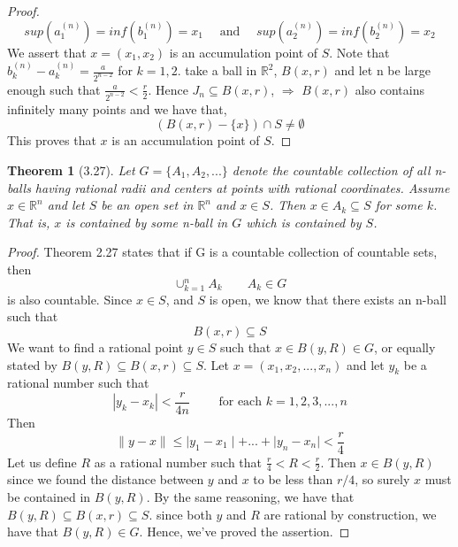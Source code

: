 \documentclass[aps,pra,notitlepage,amsmath,amssymb,letterpaper,12pt]{revtex4-1}
\newtheorem{theorem}{Theorem}
\begin{document}
\begin{proof}
$$sup(a_{1}^{(n)}) = inf(b_{1}^{(n)}) = x_{1} \quad \textrm{ and } \quad sup(a_{2}^{(n)}) = inf(b_{2}^{(n)}) = x_{2}$$
We assert that $x=(x_{1}, x_{2})$ is an accumulation point of $S$. Note that $b_{k}^{(n)}-a_{k}^{(n)} = \frac{a}{2^{n-2}}$ for $k = 1,2$. take a ball in $\mathbb{R}^{2}$, $B(x,r)$ and let n be large enough such that $\frac{a}{2^{n-2}} < \frac{r}{2}$. Hence $J_{n} \subseteq B(x,r)$, $\Rightarrow$ $B(x,r)$ also contains infinitely many points and we have that,
$$ (B(x,r)- \{x\}) \cap S \ne \emptyset $$
This proves that $x$ is an accumulation point of $S$.



\end{proof}


\begin{theorem}[3.27] \nonumber
Let $G = \{A_{1},A_{2},...\}$ denote the countable collection of all n-balls having rational radii and centers at points with rational coordinates. Assume $x \in \mathbb{R}^n$ and let $S$ be an open set in $\mathbb{R}^n$ and $x \in S$. Then $x \in A_{k} \subseteq S$ for some $k$. That is, $x$ is contained by some n-ball in $G$ which is contained by $S$.
\end{theorem}
\begin{proof}
Theorem 2.27 states that if G is a countable collection of countable sets, then
\[\cup_{k=1}^{n} A_{k} \qquad A_{k} \in G\]
is also countable. Since $x \in S$, and $S$ is open, we know that there exists an n-ball such that
\[B(x,r) \subseteq S\]
We want to find a rational point $y\in S$ such that $x \in B(y,R) \in G$, or equally stated by $B(y,R) \subseteq B(x,r) \subseteq S$. Let
$x=(x_{1},x_{2},...,x_{n})$ and let $y_{k}$ be a rational number such that
\[\left| y_{k} - x_{k} \right| < \frac{r}{4n} \qquad \textrm{ for each } k=1,2,3,...,n\]
Then
\[\|y-x\| \leq \mid y_{1}-x_{1} \mid + ... + \mid y_{n}-x_{n} \mid < \frac{r}{4}\]
Let us define $R$ as a rational number such that $\frac{r}{4} < R < \frac{r}{2}$. Then
$x \in B(y,R)$ since we found the distance between $y$ and $x$ to be less than $r/4$, so surely $x$ must be contained in $B(y,R)$. By the same reasoning, we have that $B(y,R) \subseteq B(x,r) \subseteq S$. since both $y$ and $R$ are rational by construction, we have that $B(y,R) \in G$. Hence, we've proved the assertion.
\end{proof}
\end{document}
